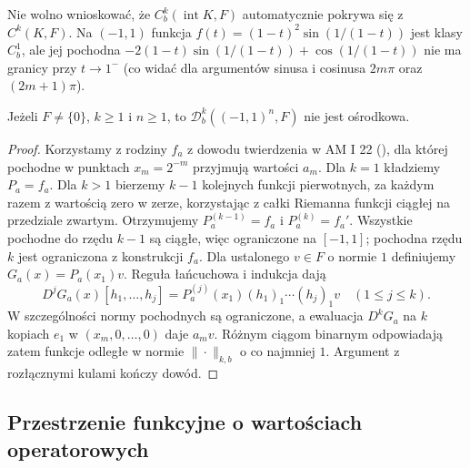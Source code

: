 Nie wolno wnioskować, że $C_b^k(\operatorname{int}K,F)$
automatycznie pokrywa się z $C^k(K,F)$.
Na $(-1,1)$ funkcja
$f(t)=(1-t)^2\sin(1/(1-t))$
jest klasy $C_b^1$, ale jej pochodna
$-2(1-t)\sin(1/(1-t))+\cos(1/(1-t))$
nie ma granicy przy $t\to1^-$
(co widać dla argumentów sinusa i cosinusa
$2m\pi$ oraz $(2m+1)\pi$).

\begin{stwierdzenie}
\label{ma2:prop:dbk-cube-nonseparable}
Jeżeli $F\ne\{0\}$, $k\ge1$ i $n\ge1$,
to $\mathcal D_b^k((-1,1)^n,F)$
nie jest ośrodkowa.
\end{stwierdzenie}
\begin{proof}
Korzystamy z rodziny $f_a$ z dowodu twierdzenia
w AM I 22 (),
dla której pochodne w punktach $x_m=2^{-m}$
przyjmują wartości $a_m$.
Dla $k=1$ kładziemy $P_a=f_a$.
Dla $k>1$ bierzemy $k-1$ kolejnych funkcji
pierwotnych, za każdym razem z wartością zero
w zerze, korzystając z całki Riemanna funkcji
ciągłej na przedziale zwartym. Otrzymujemy
$P_a^{(k-1)}=f_a$ i $P_a^{(k)}=f_a'$.
Wszystkie pochodne do rzędu $k-1$ są ciągłe,
więc ograniczone na $[-1,1]$; pochodna rzędu
$k$ jest ograniczona z konstrukcji $f_a$.
Dla ustalonego $v\in F$ o normie $1$ definiujemy
$G_a(x)=P_a(x_1)v$. Reguła łańcuchowa
i indukcja dają
\[
 D^jG_a(x)[h_1,\ldots,h_j]=
 P_a^{(j)}(x_1)(h_1)_1\cdots(h_j)_1v
 \quad(1\le j\le k).
\]
W szczególności normy pochodnych są ograniczone,
a ewaluacja $D^kG_a$ na $k$ kopiach $e_1$ w
$(x_m,0,\ldots,0)$ daje $a_mv$.
Różnym ciągom binarnym odpowiadają zatem funkcje
odległe w normie $\|\cdot\|_{k,b}$ o co najmniej $1$.
Argument z rozłącznymi kulami kończy dowód.
\end{proof}


\subsection{Przestrzenie funkcyjne o wartościach operatorowych}

